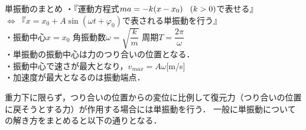  \begin{matome}{単振動のまとめ}
 \hspace{5mm} ・『運動方程式$ma=-k(x-x_0)\hspace{3mm} (k>0)$で表せる』\\
 \hspace{20mm} $\Leftrightarrow 『x=x_0+A\sin (\omega t+\varphi_0) で表される単振動を行う』$\\
 \hspace{5mm} ・振動中心$x=x_0$\hspace{3mm} 角振動数$\omega =\sqrt{\dfrac{k}{m}}$ \hspace{3mm} 周期$T=\dfrac{2\pi}{\omega}$\\
  \hspace{5mm} ・単振動の振動中心は力のつり合いの位置となる．\\
  \hspace{5mm} ・振動中心で速さが最大となり，$v_{max}=A\omega$[m/s]\\
  \hspace{5mm} ・加速度が最大となるのは振動端点．
 \end{matome} 
 
重力下に限らず，つり合いの位置からの変位に比例して復元力（つり合いの位置に戻そうとする力）が作用する場合には単振動を行う．
一般に単振動についての解き方をまとめると以下の通りとなる．

